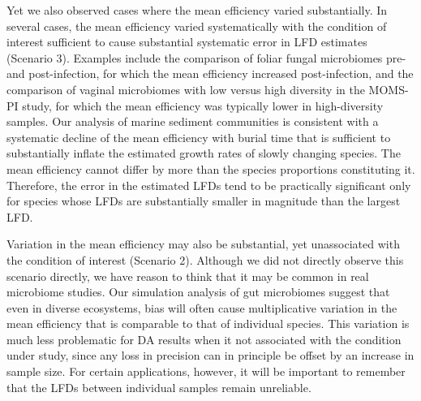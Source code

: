 \documentclass[
]{article}
\begin{document}
Yet we also observed cases where the mean efficiency varied substantially.
In several cases, the mean efficiency varied systematically with the condition of interest sufficient to cause substantial systematic error in LFD estimates (Scenario 3).
Examples include the comparison of foliar fungal microbiomes pre- and post-infection, for which the mean efficiency increased post-infection, and the comparison of vaginal microbiomes with low versus high diversity in the MOMS-PI study, for which the mean efficiency was typically lower in high-diversity samples.
Our analysis of marine sediment communities is consistent with a systematic decline of the mean efficiency with burial time that is sufficient to substantially inflate the estimated growth rates of slowly changing species.
The mean efficiency cannot differ by more than the species proportions constituting it.
Therefore, the error in the estimated LFDs tend to be practically significant only for species whose LFDs are substantially smaller in magnitude than the largest LFD.

Variation in the mean efficiency may also be substantial, yet unassociated with the condition of interest (Scenario 2).
Although we did not directly observe this scenario directly, we have reason to think that it may be common in real microbiome studies.
Our simulation analysis of gut microbiomes suggest that even in diverse ecosystems, bias will often cause multiplicative variation in the mean efficiency that is comparable to that of individual species.
This variation is much less problematic for DA results when it not associated with the condition under study, since any loss in precision can in principle be offset by an increase in sample size.
For certain applications, however, it will be important to remember that the LFDs between individual samples remain unreliable.
\end{document}
